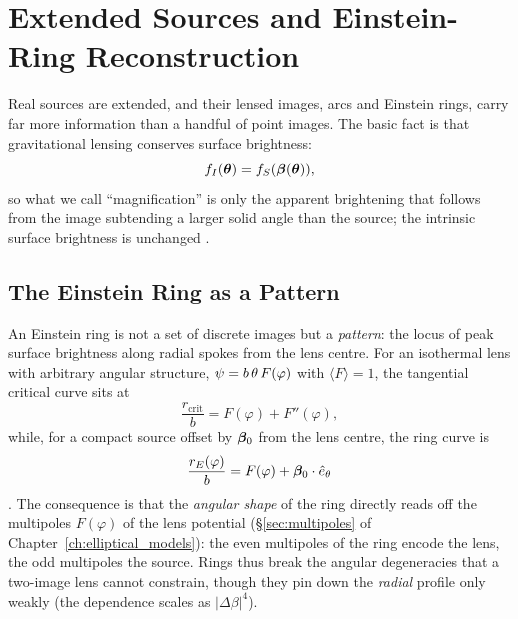 \section{Extended Sources and Einstein-Ring Reconstruction}
\label{sec:extended_sources}

Real sources are extended, and their lensed images, arcs and
Einstein rings, carry far more information than a handful of
point images.  The basic fact is that
gravitational lensing conserves surface brightness:
\begin{equation}
    f_I(\boldsymbol{\theta}) = f_S(\boldsymbol{\beta}(\boldsymbol{\theta})),
    \label{eq:sb_conservation}
\end{equation}
so what we call ``magnification'' is only the apparent brightening that
follows from the image subtending a larger solid angle than the source;
the intrinsic surface brightness is unchanged
\citep[][Part~2, \S10]{schneider_kochanek_wambsganss_2006}.

\subsection{The Einstein Ring as a Pattern}
\label{sec:ring_pattern}

An Einstein ring is not a set of discrete images but a \emph{pattern}:
the locus of peak surface brightness along radial spokes from the lens
centre.  For an isothermal lens with arbitrary angular structure,
$\psi = b\,\theta\,F(\varphi)$ with $\langle F\rangle = 1$, the
tangential critical curve sits at
\begin{equation}
    \frac{r_{\mathrm{crit}}}{b} = F(\varphi) + F''(\varphi),
    \label{eq:ring_crit}
\end{equation}
while, for a compact source offset by $\boldsymbol{\beta}_0$ from the lens centre,
the ring curve is
\begin{equation}
    \frac{r_E(\varphi)}{b} = F(\varphi) + \boldsymbol{\beta}_0 \cdot \hat{e}_\theta
    \label{eq:ring_curve}
\end{equation}
\citep[Kochanek, Keeton \& McLeod 2001; see][Part~2, eq.~141]{schneider_kochanek_wambsganss_2006}.
The consequence is that the \emph{angular shape} of the ring
directly reads off the multipoles $F(\varphi)$ of the lens potential
(\S\ref{sec:multipoles} of Chapter~\ref{ch:elliptical_models}): the even
multipoles of the ring encode the lens, the odd multipoles the source.
Rings thus break the angular degeneracies that a two-image lens cannot
constrain, though they pin down the \emph{radial} profile only weakly
(the dependence scales as $|\Delta\beta|^4$).

